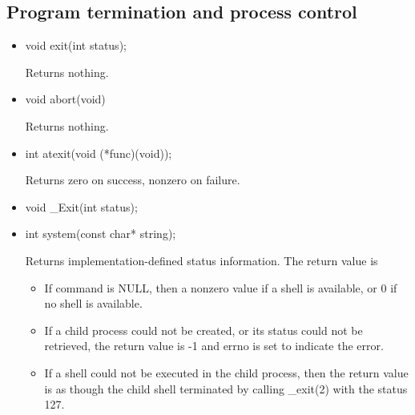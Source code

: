 \documentclass{report}
\begin{document}
    \subsection{Program termination and process control}
    \begin{itemize}
        \item
            \bigbreak \noindent 
            \begin{cppcode}
                void exit(int status); 
            \end{cppcode}
            \bigbreak \noindent 
            Returns nothing.
        \item
            \bigbreak \noindent 
            \begin{cppcode}
            void abort(void)
            \end{cppcode}
            \bigbreak \noindent 
            Returns nothing.
        \item 
            \bigbreak \noindent 
            \begin{cppcode}
                int atexit(void (*func)(void));
            \end{cppcode}
            \bigbreak \noindent 
            Returns zero on success, nonzero on failure.
        \item 
            \bigbreak \noindent 
            \begin{cppcode}
            void _Exit(int status);
            \end{cppcode}
        \item 
            \bigbreak \noindent 
            \begin{cppcode}
            int system(const char* string);
            \end{cppcode}
            \bigbreak \noindent 
            Returns implementation-defined status information.
            \bigbreak \noindent 
            The return value is 
            \begin{itemize}
                \item If command is NULL, then a nonzero value if a shell is available, or 0 if no shell is available.
                \item  If a child process could not be created, or its status could not be retrieved, the return value is -1 and errno is set to indicate the error.
                \item If a shell could not be executed in the child process, then the return value is as though the child shell terminated by calling \_exit(2) with the status 127.

\end{itemize}
\end{itemize}
\end{document}
